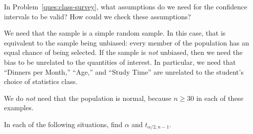 \documentclass[11pt]{exam}
\begin{document}
\begin{questions}


\question In Problem~\ref{ques:class-survey}, what assumptions do we need for
the confidence intervals to be valid?  How could we check these assumptions?

\begin{solution}
We need that the sample is a simple random sample.  In this case, that is
equivalent to the sample being unbiased: every member of the population has an
equal chance of being selected.  If the sample is \emph{not} unbiased, then we
need the bias to be unrelated to the quantities of interest.  In particular,
we need that ``Dinners per Month,'' ``Age,'' and ``Study Time'' are
unrelated to the student's choice of statistics class.

We do \emph{not} need that the population is normal, because $n \geq 30$ in
each of these examples.
\end{solution}

\newpage


\question \label{ques:t-alpha} In each of the following situations, find
$\alpha$ and $t_{\alpha/2,n-1}$.

\end{questions}
\end{document}
